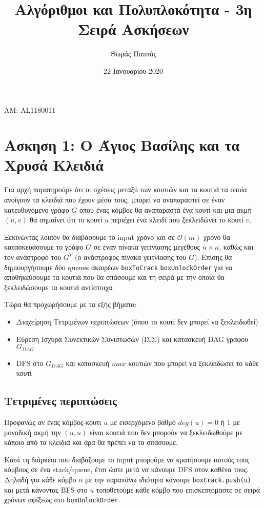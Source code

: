 \documentclass[a4paper,11pt]{article}
\begin{document}
\title{Αλγόριθμοι και Πολυπλοκότητα - 3η Σειρά Ασκήσεων}
\author{Θωμάς Παππάς}
\date{22 Ιανουαρίου 2020}
\maketitle
\begin{center}ΑΜ: AL1180011\end{center}

\section*{Ασκηση 1: Ο Άγιος Βασίλης και τα Χρυσά Κλειδιά}

Για αρχή παρατηρούμε ότι οι σχέσεις μεταξύ των κουτιών και τα κουτιά τα οποία ανοίγουν τα κλειδιά που έχουν μέσα τους, μπορεί να αναπαραστεί σε έναν κατευθυνόμενο γράφο $G$ όπου ένας κόμβος θα αναπαραστά ένα κουτί και μια ακμή $(u, v)$ θα σημαίνει ότι το κουτί $u$ περιέχει ένα κλειδί που ξεκλειδώνει το κουτί $v$.

Ξεκινώντας λοιπόν θα διαβάσουμε το input χρόνο και σε $\mathcal{O}(m)$ χρόνο θα κατασκευάσουμε το γράφο $G$ σε έναν πίνακα γειτνίασης μεγέθους $n \times n$, καθώς και τον ανάστροφό του $G^T$ (ο ανάστροφος πίνακα γειτνίασης του $G$). Επίσης θα δημιουργήσουμε δύο queues ακαιρέων \verb|boxToCrack| \verb|boxUnlockOrder| για να αποθηκεύσουμε τα κουτιά που θα σπάσουμε και τη σειρά με την οποία θα ξεκλειδώσουμε τα κουτιά αντίστοιχα.

Τώρα θα προχωρήσουμε με τα εξής βήματα:
\begin{itemize}
  \item Διαχείρηση Τετριμένων περιπτώσεων (όπου το κουτί δεν μπορεί να ξεκλειδωθεί)
  \item Εύρεση Ισχυρά Συνεκτικών Συνιστωσών (ΙΣΣ) και κατασκευή DAG γράφου $G_{DAG}$
  \item DFS στο $G_{DAG}$ και κατασκευή $max$ κουτιών που μπορεί να ξεκλειδώσει το κάθε κουτί
\end{itemize}

\subsection*{Τετριμένες περιπτώσεις}
Προφανώς αν ένας κόμβος-κουτι $u$ με εισερχόμενο βαθμό $deg(u) = 0$ ή $1$ με μοναδική ακμή την $(u, u)$ είναι κουτιά που δεν μπορούν να ξεκλειδωθούμε με κάποιο από τα κλειδιά και άρα θα πρέπει να τα σπάσουμε.

Κατά τη διάρκεια που διαβάζουμε το input μπορούμε να κρατήσουμε αυτούς τους κόμβους σε ένα stack/queue, έτσι ώστε μετά να κάνουμε DFS στον καθένα τους. Δηλαδή για κάθε κόμβο $u$ με την παραπάνω ιδιότητα κάνουμε \verb|boxCrack.push(u)| και μετά κάνοντας ΒFS στο $u$ τοποθετούμε κάθε κόμβο που επισκεπτόμαστε σε σειρά χρόνων αφίξεως στο \verb|boxUnlockOrder|.
\end{document}
